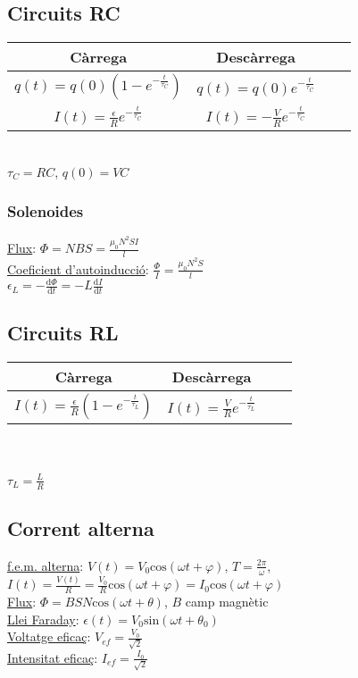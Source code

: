 \documentclass[12pt]{article}
\begin{document}
\begin{multicols}{2}
\subsection*{Circuits RC}

\begin{tabular}{|c|c|c|c|}
    \hline
    Càrrega & Descàrrega \\ \hline \hline
    $q(t) = q(0)\left( 1 - e^{-\frac{t}{\tau_C}}\right)$ & $q(t) = q(0)e^{-\frac{t}{\tau_C}}$ \\ \hline
    $I(t) = \frac{\epsilon}{R} e^{-\frac{t}{\tau_C}}$ & $I(t) = -\frac{V}{R}e^{-\frac{t}{\tau_C}}$ \\ \hline
\end{tabular}
\\

$\tau_C = RC$, $q(0) = VC$

\subsubsection*{Solenoides}

\underline{Flux}: $\Phi = NBS = \frac{\mu_0 N^2SI}{l}$ \\
\underline{Coeficient d'autoinducció}: $\frac{\Phi}{I} = \frac{\mu_0N^2S}{l}$ \\
$\epsilon_L= -\frac{\text{d}\Phi}{\text{d}t} = -L \frac{\text{d}I}{\text{d}t}$

\subsection*{Circuits RL}

\begin{tabular}{|c|c|c|c|}
    \hline
    Càrrega & Descàrrega \\ \hline \hline
    $I(t) = \frac{\epsilon}{R} \left(1 - e^{-\frac{t}{\tau_L}}\right)$ & $I(t) = \frac{V}{R}e^{-\frac{t}{\tau_L}}$ \\ \hline
\end{tabular} \\ \\
$\tau_L = \frac{L}{R}$

\subsection*{Corrent alterna}
\underline{f.e.m. alterna}: $V(t) = V_0\text{cos}(\omega t+\varphi)$, $T = \frac{2\pi}{\omega}$, $I(t) = \frac{V(t)}{R} = \frac{V_0}{R}\text{cos}(\omega t + \varphi) = I_0\text{cos}(\omega t + \varphi)$ \\
\underline{Flux}: $\Phi = BSN\text{cos}(\omega t+\theta)$, $B$ camp magnètic \\
\underline{Llei Faraday}: $\epsilon(t) = V_0\text{sin}(\omega t + \theta_0)$ \\
\underline{Voltatge eficaç}: $V_{ef} = \frac{V_0}{\sqrt{2}}$ \\
\underline{Intensitat eficaç}: $I_{ef} = \frac{I_0}{\sqrt{2}}$


\end{multicols}
\end{document}

